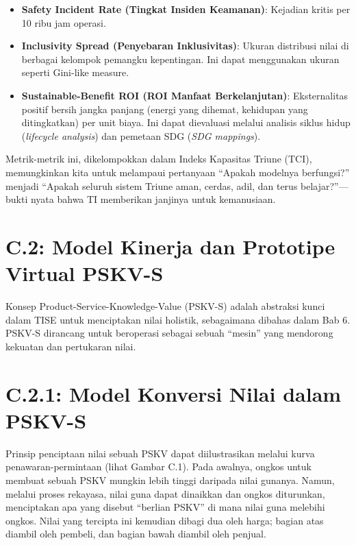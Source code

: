 \documentclass[
  letterpaper,
  DIV=11,
  numbers=noendperiod]{scrreprt}
\providecommand{\tightlist}{%
  \setlength{\itemsep}{0pt}\setlength{\parskip}{0pt}}
\begin{document}
\begin{enumerate}
  \begin{itemize}
  \tightlist
  \item
    \textbf{Safety Incident Rate (Tingkat Insiden Keamanan)}: Kejadian
    kritis per 10 ribu jam operasi.
  \item
    \textbf{Inclusivity Spread (Penyebaran Inklusivitas)}: Ukuran
    distribusi nilai di berbagai kelompok pemangku kepentingan. Ini
    dapat menggunakan ukuran seperti Gini-like measure.
  \item
    \textbf{Sustainable-Benefit ROI (ROI Manfaat Berkelanjutan)}:
    Eksternalitas positif bersih jangka panjang (energi yang dihemat,
    kehidupan yang ditingkatkan) per unit biaya. Ini dapat dievaluasi
    melalui analisis siklus hidup (\emph{lifecycle analysis}) dan
    pemetaan SDG (\emph{SDG mappings}).
  \end{itemize}
\end{enumerate}

Metrik-metrik ini, dikelompokkan dalam Indeks Kapasitas Triune (TCI),
memungkinkan kita untuk melampaui pertanyaan ``Apakah modelnya
berfungsi?'' menjadi ``Apakah seluruh sistem Triune aman, cerdas, adil,
dan terus belajar?''---bukti nyata bahwa TI memberikan janjinya untuk
kemanusiaan.

\section{\texorpdfstring{\textbf{C.2: Model Kinerja dan Prototipe
Virtual
PSKV-S}}{C.2: Model Kinerja dan Prototipe Virtual PSKV-S}}\label{c.2-model-kinerja-dan-prototipe-virtual-pskv-s}

Konsep Product-Service-Knowledge-Value (PSKV-S) adalah abstraksi kunci
dalam TISE untuk menciptakan nilai holistik, sebagaimana dibahas dalam
Bab 6. PSKV-S dirancang untuk beroperasi sebagai sebuah ``mesin'' yang
mendorong kekuatan dan pertukaran nilai.

\section{\texorpdfstring{\textbf{C.2.1: Model Konversi Nilai dalam
PSKV-S}}{C.2.1: Model Konversi Nilai dalam PSKV-S}}\label{c.2.1-model-konversi-nilai-dalam-pskv-s}

Prinsip penciptaan nilai sebuah PSKV dapat diilustrasikan melalui kurva
penawaran-permintaan (lihat Gambar C.1). Pada awalnya, ongkos untuk
membuat sebuah PSKV mungkin lebih tinggi daripada nilai gunanya. Namun,
melalui proses rekayasa, nilai guna dapat dinaikkan dan ongkos
diturunkan, menciptakan apa yang disebut ``berlian PSKV'' di mana nilai
guna melebihi ongkos. Nilai yang tercipta ini kemudian dibagi dua oleh
harga; bagian atas diambil oleh pembeli, dan bagian bawah diambil oleh
penjual.
\end{document}
